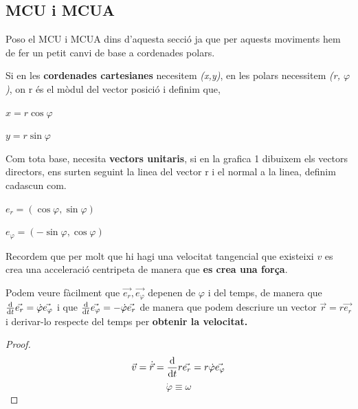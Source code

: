\documentclass[12pt]{article}
\newcommand{\axes}[4]{%
  \draw[ax] (0,0) -- (#1,0) node[right, black] {#3};
  \draw[ax] (0,0) -- (0,#2) node[above, black] {#4};}
\begin{document}
\subsection{MCU i MCUA}

Poso el MCU i MCUA dins d'aquesta secció ja que per aquests moviments hem de fer un petit canvi de base a cordenades polars.

\begin{center}
\end{center}

Si en les \textbf{cordenades cartesianes} necesitem \textit{(x,y)}, en les polars necessitem \textit{(r, $\varphi$)}, on r és el mòdul del vector posició i definim que,

$x = r\cos \varphi$

$y = r\sin \varphi$

Com tota base, necesita \textbf{vectors unitaris}, si en la grafica 1 dibuixem els vectors directors, ens surten seguint la linea del vector r i el normal a la linea, definim cadascun com.

$e_r = (\cos \varphi, \sin \varphi)$

$e_\varphi = (-\sin \varphi, \cos \varphi)$

Recordem que per molt que hi hagi una velocitat tangencial que existeixi $v$ es crea una acceleració centripeta de manera que \textbf{es crea una força}.

Podem veure fàcilment que $\vec{e_r}, \vec{e_{\varphi}}$ depenen de $\varphi$ i del temps, de manera que $\dv{}{t}\vec{e_r} = \dot{\varphi} \vec{e_{\varphi}}$ i que $\dv{}{t}\vec{e_{\varphi}} = -\dot{\varphi} \vec{ e_{r}}$ de manera que podem descriure un vector \textbf{$\vec{r} = r\vec{e_r}$} i derivar-lo respecte del temps per \textbf{obtenir la velocitat.}

\begin{proof}
\[\vec{v} = \dot{\vec{r}} = \dv{}{t}r\vec{e_r} = r \dot{\varphi}\vec{e_\varphi}\]
\[\dot{\varphi} \equiv \omega\]
\end{proof}
\end{document}
